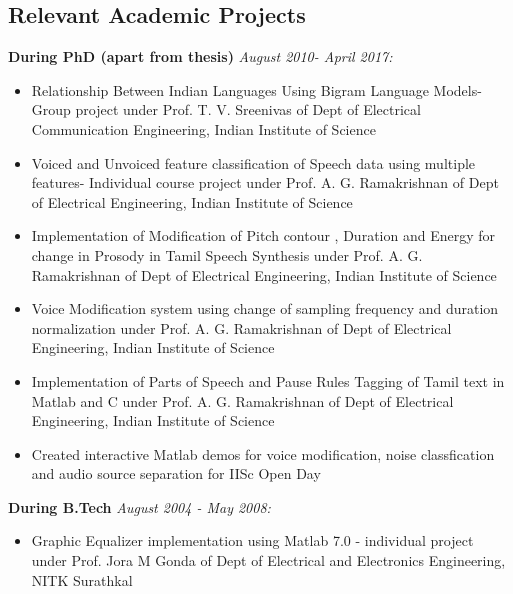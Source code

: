 \documentclass[line]{resume}
\begin{document}
{\begin{resume}
		
					
		\section{\mysidestyle Relevant Academic Projects}	
		\vspace{.1cm}
 \textbf{ During PhD (apart from thesis)} \textit{August 2010- April 2017:}
\begin{itemize}\itemsep=0.25em
	\item
	Relationship Between Indian Languages Using Bigram Language Models- Group
project under Prof. T. V. Sreenivas of Dept of Electrical Communication Engineering,
Indian Institute of Science

\item
Voiced and Unvoiced feature classification of Speech data using multiple features-
Individual course project under Prof. A. G. Ramakrishnan of Dept of Electrical
Engineering, Indian Institute of Science

\item
Implementation of Modification of Pitch contour , Duration and Energy   for change in Prosody in Tamil Speech Synthesis under Prof. A. G. Ramakrishnan of Dept of Electrical
Engineering, Indian Institute of Science
\item
Voice Modification system using change of sampling frequency and duration normalization under Prof. A. G. Ramakrishnan of Dept of Electrical
Engineering, Indian Institute of Science
\item
Implementation of Parts of Speech and Pause Rules Tagging of Tamil text in Matlab and C under Prof. A. G. Ramakrishnan of Dept of Electrical
Engineering, Indian Institute of Science
\item Created interactive Matlab demos for voice modification, noise classfication and audio source separation for IISc Open Day


	\end{itemize}

 \textbf{ During B.Tech} \textit{August 2004 - May 2008:}
 
\begin{itemize}\itemsep=0.25em


\item
Graphic Equalizer implementation using Matlab 7.0
- individual project under Prof. Jora M Gonda of Dept of
Electrical and Electronics Engineering, NITK Surathkal


\end{itemize}
\end{resume}}
\end{document}
